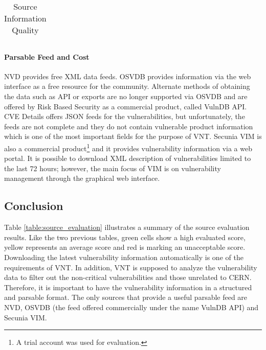 \begin{table}
\begin{center}
{\begin{tabular}{ | c || c | c | c | c | c | c |}
     
\end{tabular}
}
    \caption{Source Information Quality}
    \label{table:info_quality}
   \end{center}
    \end{table}
    
    
    
    
    
\paragraph{Parsable Feed and Cost}
NVD provides free XML data feeds. OSVDB provides information via the web interface as a free resource for the community. Alternate methods of obtaining the data such as API or exports are no longer supported via OSVDB and are offered by Risk Based Security as a commercial product, called VulnDB API. CVE Details offers JSON feeds for the vulnerabilities, but unfortunately, the feeds are not complete and they do not contain vulnerable product information which is one of the most important fields for the purpose of VNT. Secunia VIM is also a commercial product\footnote{A trial account was used for evaluation.} and it provides vulnerability information via a web portal. It is possible to download XML description of vulnerabilities limited to the last 72 hours; however, the main focus of VIM is on vulnerability management through the graphical web interface. 
    
   

\subsection{Conclusion}
Table \ref{table:source_evaluation} illustrates a summary of the source evaluation results. Like the two previous tables, green cells show a high evaluated score, yellow represents an average score and red is marking an unacceptable score. Downloading the latest vulnerability information automatically is one of the requirements of VNT. In addition, VNT is supposed to analyze the vulnerability data to filter out the non-critical vulnerabilities and those unrelated to CERN. Therefore, it is important to have the vulnerability information in a structured and parsable format. 
The only sources that provide a useful parsable feed are NVD, OSVDB (the feed offered commercially under the name VulnDB API) and Secunia VIM. 
